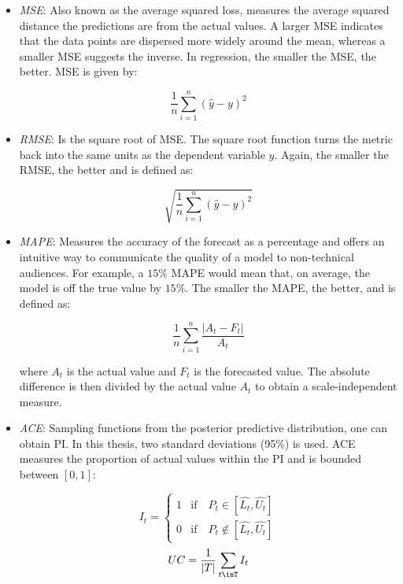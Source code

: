 \begin{itemize}
    \item \textit{MSE}: Also known as the average squared loss, measures the average squared distance the predictions are from the actual values. A larger MSE indicates that the data points are dispersed more widely around the mean, whereas a smaller MSE suggests the inverse. In regression, the smaller the MSE, the better. MSE is given by:
    
    \begin{equation}
        \frac{1}{n}\sum_{i=1}^n(\hat{y} - y)^2
    \end{equation}
    
    \item \textit{RMSE}: Is the square root of MSE. The square root function turns the metric back into the same units as the dependent variable $y$. Again, the smaller the RMSE, the better and is defined as:
    
    \begin{equation}
        \sqrt{\frac{1}{n}\sum_{i=1}^n(\hat{y} - y)^2}
    \end{equation}
    
    \item \textit{MAPE}: Measures the accuracy of the forecast as a percentage and offers an intuitive way to communicate the quality of a model to non-technical audiences. For example,  a $15\%$ MAPE would mean that, on average, the model is off the true value by $15\%$. The smaller the MAPE, the better, and is defined as:
    
    \begin{equation}
        \frac{1}{n}\sum_{i=1}^n \frac{|A_t - F_t|}{A_t}
    \end{equation}
    
    where $A_t$ is the actual value and $F_t$ is the forecasted value. The absolute difference is then divided by the actual value $A_t$ to obtain a scale-independent measure. 
    
    \item \textit{ACE}: Sampling functions from the posterior predictive distribution, one can obtain \ac{PI}. In this thesis, two standard deviations (95\%) is used. ACE measures the proportion of actual values within the PI and is bounded between $[0, 1]$:
    
    
    \begin{equation}
        I_t = 
    \begin{cases}
      1 & \text{if} \quad P_t \in [\hat{L_t}, \hat{U_t}] \\
      0 & \text{if} \quad P_t \notin [\hat{L_t}, \hat{U_t}]
    \end{cases}
    \end{equation}
    \begin{equation}
        UC = \frac{1}{|T|}\sum_{t\inT}I_t
    \end{equation}
    

\end{itemize}
